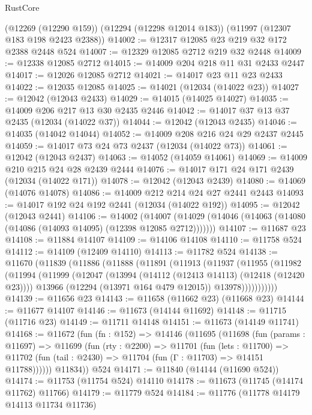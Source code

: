 \begin{lexlean}{RustCore}
\begin{coremodule}
    (@12269 (@12290 @159))
    (@12294 (@12298 @12014 @183))
    (@11997 (@12307 @183 @198 @2423 @2388))
@14002 := @12317 @12085 @23 @219 @32 @172 @2388 @2448 @524
@14007 := @12329 @12085 @2712 @219 @32 @2448
@14009 := @12338 @12085 @2712
@14015 := @14009 @204 @218 @11 @31 @2433 @2447
@14017 := @12026 @12085 @2712
@14021 := @14017 @23 @11 @23 @2433
@14022 := @12035 @12085
@14025 := @14021 (@12034 (@14022 @23))
@14027 := @12042 (@12043 @2433)
@14029 := @14015 (@14025 @14027)
@14035 := @14009 @206 @217 @13 @30 @2435 @2446
@14042 := @14017 @37 @13 @37 @2435 (@12034 (@14022 @37))
@14044 := @12042 (@12043 @2435)
@14046 := @14035 (@14042 @14044)
@14052 := @14009 @208 @216 @24 @29 @2437 @2445
@14059 := @14017 @73 @24 @73 @2437 (@12034 (@14022 @73))
@14061 := @12042 (@12043 @2437)
@14063 := @14052 (@14059 @14061)
@14069 := @14009 @210 @215 @24 @28 @2439 @2444
@14076 := @14017 @171 @24 @171 @2439 (@12034 (@14022 @171))
@14078 := @12042 (@12043 @2439)
@14080 := @14069 (@14076 @14078)
@14086 := @14009 @212 @214 @24 @27 @2441 @2443
@14093 := @14017 @192 @24 @192 @2441 (@12034 (@14022 @192))
@14095 := @12042 (@12043 @2441)
@14106 := @14002
    (@14007 (@14029 (@14046 (@14063 (@14080 (@14086 (@14093 @14095) (@12398 @12085 @2712)))))))
@14107 := @11687 @23
@14108 := @11884 @14107
@14109 := @14106 @14108
@14110 := @11758 @524
@14112 := @14109 (@12409 @14110)
@14113 := @11782 @524
@14138 := @11670
    (@11839
      (@11886
        (@11888
          (@11891
            (@11913
              (@11937
                (@11955
                  (@11982
                    (@11994
                      (@11999
                        (@12047
                          (@13994 (@14112 (@12413 @14113) (@12418 (@12420 @23))))
                          @13966
                          (@12294 (@13971 @164 @479 @12015))
                          @13978)))))))))))
@14139 := @11656 @23
@14143 := @11658 (@11662 @23) (@11668 @23)
@14144 := @11677 @14107
@14146 := @11673 (@14144 @11692)
@14148 := @11715 (@11716 @23)
@14149 := @11711 @14148
@14151 := @11673 (@14149 @11741)
@14168 := @11672
    (fun (fn : @152) =>
    @14146
      (@11695
        (@11698
          (fun (params : @11697) =>
          @11699
            (fun (rty : @2200) =>
            @11701
              (fun (lets : @11700) =>
              @11702 (fun (tail : @2430) => @11704 (fun (Γ : @11703) => @14151 @11788))))))
        @11834))
    @524
@14171 := @11840 (@14144 (@11690 @524))
@14174 := @11753 (@11754 @524) @14110
@14178 := @11673 (@11745 (@14174 @11762) @11766)
@14179 := @11779 @524
@14184 := @11776 (@11778 @14179 @14113 @11734 @11736)

\end{coremodule}
\end{lexlean}

